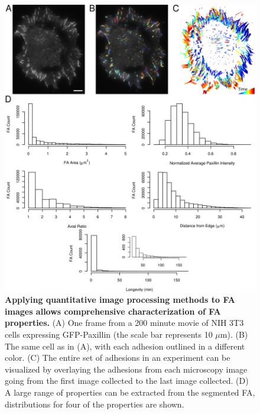 \begin{figure}[htbp]
\begin{center}
\includegraphics[width=\textwidth]{../figures/statics/statics}
\end{center}
\caption{
{\bf Applying quantitative image processing methods to FA images allows
comprehensive characterization of FA properties.} (A) One frame from a 200
minute movie of NIH 3T3 cells expressing GFP-Paxillin (the scale bar represents
10 $\mu$m). (B) The same cell as in (A), with each adhesion outlined in a
different color. (C) The entire set of adhesions in an experiment can be
visualized by overlaying the adhesions from each microscopy image going from the
first image collected to the last image collected. (D) A large range of
properties can be extracted from the segmented FA, distributions for four of the
properties are shown.
}
\label{statics}
\end{figure}



